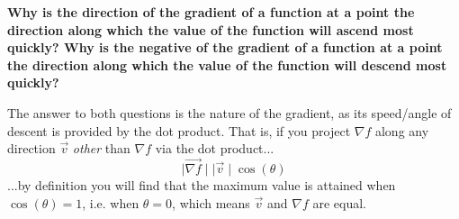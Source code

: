 \documentclass{article}
\begin{document}
\textbf{Why is the direction of the gradient of a function at a point the direction along
which the value of the function will ascend most quickly? Why is the negative
of the gradient of a function at a point the direction along which the value of
the function will descend most quickly?}\newline

The answer to both questions is the nature of the gradient, as its speed/angle of descent is provided by the dot product. That is, if you project $\nabla f$ along any direction $\vec{v}$ \textit{other} than $\nabla f$ via the dot product...
\[\mid\vec{\nabla f}\mid\mid\vec{v}\mid\cos(\theta)\]
...by definition you will find that the maximum value is attained when $\cos(\theta)=1$, i.e. when $\theta=0$, which means $\vec{v}$ and $\nabla f$ are equal.
    
    
    
\end{document}
